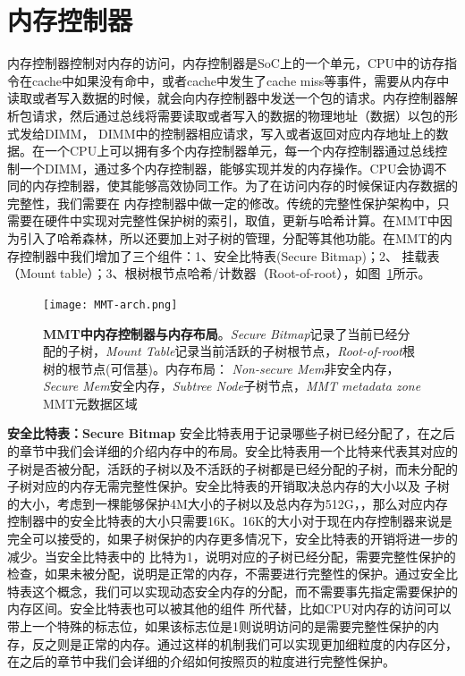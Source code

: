 \section{内存控制器}
内存控制器控制对内存的访问，内存控制器是SoC上的一个单元，CPU中的访存指令在cache中如果没有命中，或者cache中发生了cache miss等事件，需要从内存中读取或者写入数据的时候，就会向内存控制器中发送一个包的请求。内存控制器解析包请求，然后通过总线将需要读取或者写入的数据的物理地址（数据）以包的形式发给DIMM，
DIMM中的控制器相应请求，写入或者返回对应内存地址上的数据。在一个CPU上可以拥有多个内存控制器单元，每一个内存控制器通过总线控制一个DIMM，通过多个内存控制器，能够实现并发的内存操作。CPU会协调不同的内存控制器，使其能够高效协同工作。为了在访问内存的时候保证内存数据的完整性，我们需要在
内存控制器中做一定的修改。传统的完整性保护架构中，只需要在硬件中实现对完整性保护树的索引，取值，更新与哈希计算。在MMT中因为引入了哈希森林，所以还要加上对子树的管理，分配等其他功能。在MMT的内存控制器中我们增加了三个组件：1、安全比特表(Secure Bitmap)；2、
挂载表（Mount table）；3、根树根节点哈希/计数器（Root-of-root），如图~\ref{fig:MMT-arch.png}所示。
\begin{figure}[!htp]
    \centering
    \texttt{[image: MMT-arch.png]}
    \caption{\textbf{MMT中内存控制器与内存布局}。\emph{Secure Bitmap}记录了当前已经分配的子树，\emph{Mount Table}记录当前活跃的子树根节点，\emph{Root-of-root}根树的根节点(可信基)。内存布局：
    \emph{Non-secure Mem}非安全内存，\emph{Secure Mem}安全内存，\emph{Subtree Node}子树节点，\emph{MMT metadata zone} MMT元数据区域}
   \label{fig:MMT-arch.png}
\end{figure}

\textbf{安全比特表：Secure Bitmap}
安全比特表用于记录哪些子树已经分配了，在之后的章节中我们会详细的介绍内存中的布局。安全比特表用一个比特来代表其对应的子树是否被分配，活跃的子树以及不活跃的子树都是已经分配的子树，而未分配的子树对应的内存无需完整性保护。安全比特表的开销取决总内存的大小以及
子树的大小，考虑到一棵能够保护4M大小的子树以及总内存为512G，，那么对应内存控制器中的安全比特表的大小只需要16K。16K的大小对于现在内存控制器来说是完全可以接受的，如果子树保护的内存更多情况下，安全比特表的开销将进一步的减少。当安全比特表中的
比特为1，说明对应的子树已经分配，需要完整性保护的检查，如果未被分配，说明是正常的内存，不需要进行完整性的保护。通过安全比特表这个概念，我们可以实现动态安全内存的分配，而不需要事先指定需要保护的内存区间。安全比特表也可以被其他的组件
所代替，比如CPU对内存的访问可以带上一个特殊的标志位，如果该标志位是1则说明访问的是需要完整性保护的内存，反之则是正常的内存。通过这样的机制我们可以实现更加细粒度的内存区分，在之后的章节中我们会详细的介绍如何按照页的粒度进行完整性保护。

